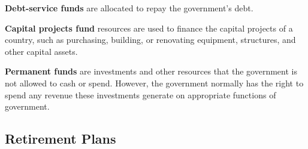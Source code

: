 \documentclass{article}
\begin{document}
      \begin{definition}
      \textbf{Debt-service funds} are allocated to repay the government's debt. 
      \end{definition}

      \begin{definition}
      \textbf{Capital projects fund} resources are used to finance the capital projects of a country, such as purchasing, building, or renovating equipment, structures, and other capital assets. 
      \end{definition}

      \begin{definition}
      \textbf{Permanent funds} are investments and other resources that the government is not allowed to cash or spend. However, the government normally has the right to spend any revenue these investments generate on appropriate functions of government.
      \end{definition}

  \subsection{Retirement Plans}
\end{document}
